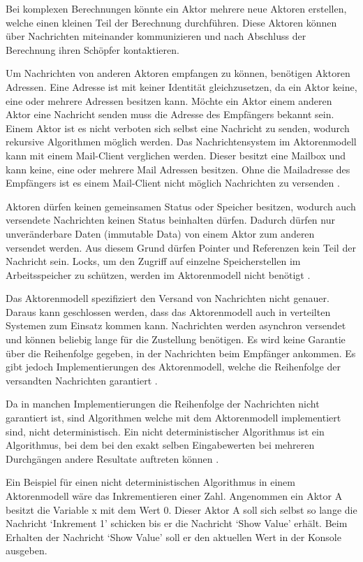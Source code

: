 Bei komplexen Berechnungen könnte ein Aktor mehrere neue Aktoren erstellen, welche einen kleinen Teil der Berechnung durchführen. Diese Aktoren können über Nachrichten miteinander kommunizieren und nach Abschluss der Berechnung ihren Schöpfer kontaktieren. 

Um Nachrichten von anderen Aktoren empfangen zu können, benötigen Aktoren Adressen. Eine Adresse ist mit keiner Identität gleichzusetzen, da ein Aktor keine, eine oder mehrere Adressen besitzen kann. Möchte ein Aktor einem anderen Aktor eine Nachricht senden muss die Adresse des Empfängers bekannt sein. Einem Aktor ist es nicht verboten sich selbst eine Nachricht zu senden, wodurch rekursive Algorithmen möglich werden. Das Nachrichtensystem im Aktorenmodell kann mit einem Mail-Client verglichen werden. Dieser besitzt eine Mailbox und kann keine, eine oder mehrere Mail Adressen besitzen. Ohne die Mailadresse des Empfängers ist es einem Mail-Client nicht möglich Nachrichten zu versenden \cite[p. 85]{Erb2012}. 

Aktoren dürfen keinen gemeinsamen Status oder Speicher besitzen, wodurch auch versendete Nachrichten keinen Status beinhalten dürfen. Dadurch dürfen nur unveränderbare Daten (immutable Data) von einem Aktor zum anderen versendet werden. Aus diesem Grund dürfen Pointer und Referenzen kein Teil der Nachricht sein. Locks, um den Zugriff auf einzelne Speicherstellen im Arbeitsspeicher zu schützen, werden im Aktorenmodell nicht benötigt \cite[p. 85]{Erb2012}.

Das Aktorenmodell spezifiziert den Versand von Nachrichten nicht genauer. Daraus kann geschlossen werden, dass das Aktorenmodell auch in verteilten Systemen zum Einsatz kommen kann. Nachrichten werden asynchron versendet und können beliebig lange für die Zustellung benötigen. Es wird keine Garantie über die Reihenfolge gegeben, in der Nachrichten beim Empfänger ankommen. Es gibt jedoch Implementierungen des Aktorenmodell, welche die Reihenfolge der versandten Nachrichten garantiert \cite[p. 85]{Erb2012}.

Da in manchen Implementierungen die Reihenfolge der Nachrichten nicht garantiert ist, sind Algorithmen welche mit dem Aktorenmodell implementiert sind, nicht deterministisch. Ein nicht deterministischer Algorithmus ist ein Algorithmus, bei dem bei den exakt selben Eingabewerten bei mehreren Durchgängen andere Resultate auftreten können \cite[]{Agh85}. 

Ein Beispiel für einen nicht deterministischen Algorithmus in einem Aktorenmodell wäre das Inkrementieren einer Zahl. Angenommen ein Aktor A besitzt die Variable x mit dem Wert 0. Dieser Aktor A soll sich selbst so lange die Nachricht `Inkrement 1' schicken bis er die Nachricht `Show Value' erhält. Beim Erhalten der Nachricht `Show Value' soll er den aktuellen Wert in der Konsole ausgeben.

